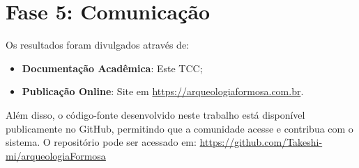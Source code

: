 \section{Fase 5: Comunicação} \label{sec:comunicacao-dsr}

Os resultados foram divulgados através de:
\begin{itemize}
    \item \textbf{Documentação Acadêmica}: Este TCC;
    \item \textbf{Publicação Online}: Site em \url{https://arqueologiaformosa.com.br}.
\end{itemize}

Além disso, o código-fonte desenvolvido neste trabalho está disponível publicamente no GitHub, permitindo que a comunidade acesse e contribua com o sistema. O repositório pode ser acessado em: \href{https://github.com/Takeshi-mi/arqueologiaFormosa}{https://github.com/Takeshi-mi/arqueologiaFormosa}